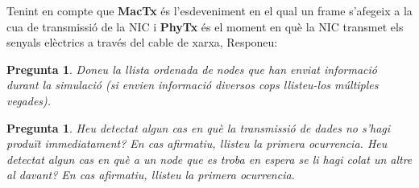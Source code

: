 \documentclass[12pt,a4paper]{article}
\newcounter{exercises}
\newtheorem{exer}[exercises]{Pregunta}
\begin{document}
\begin{enumerate}
Tenint en compte que \textbf{MacTx} és l'esdeveniment en el qual un frame s'afegeix a la cua de transmissió de la NIC i \textbf{PhyTx} és el moment en què la NIC transmet els senyals elèctrics a través del cable de xarxa, Responeu:
\begin{exer} Doneu la llista ordenada de nodes que han enviat informació durant la simulació (si envien informació diversos cops llisteu-los múltiples vegades). \end{exer}
\begin{exer} Heu detectat algun cas en què la transmissió de dades no s'hagi produït immediatament? En cas afirmatiu, llisteu la primera ocurrencia.
Heu detectat algun cas en què a un node que es troba en espera se li hagi colat un altre al davant? En cas afirmatiu, llisteu la primera ocurrencia.\end{exer}
\end{enumerate}
\end{document}
